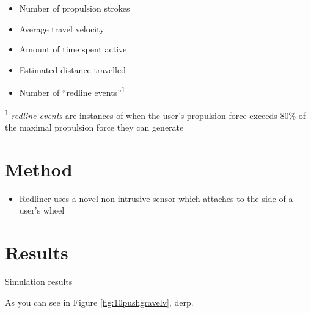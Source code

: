 \documentclass[a0,landscape]{a0poster}
\begin{document}
\begin{multicols*}{3}
\begin{itemize}
    \item Number of propulsion strokes
    \item Average travel velocity
    \item Amount of time spent active
    \item Estimated distance travelled
    \item Number of ``redline events''\textsuperscript{1}
\end{itemize}

\textsuperscript{1} \textit{redline events} are instances of when the user's propulsion force exceeds 80\% of the maximal propulsion force they can generate

\section*{Method}

\begin{itemize}
    \item Redliner uses a novel non-intrusive sensor which attaches to the side of a user's wheel
\end{itemize}

\section*{Results}
\noindent
\begin{minipage}{\columnwidth}
\makeatletter
\newcommand{\@captype}{figure}
\makeatother
\centering
{}\qquad%
\caption{Simulation results}
\end{minipage}

As you can see in Figure \ref{fig:10pushgravelv}, derp.


\end{multicols*}
\end{document}
